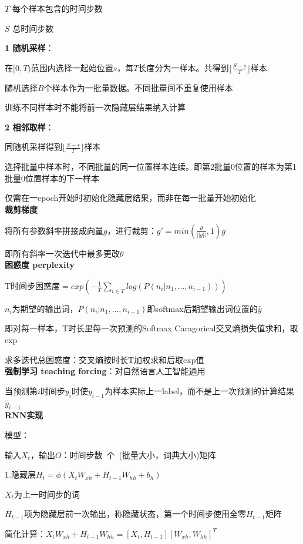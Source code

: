 \documentclass[UTF8]{ctexart}
\begin{document}
  $T$ 每个样本包含的时间步数

  $S$ 总时间步数

  \textbf{1 随机采样}：

  \quad 在$[0, T)$范围内选择一起始位置$s$，每$T$长度分为一样本。共得到$\lfloor \frac{S - s}{T} \rfloor$样本

  \quad 随机选择$B$个样本作为一批量数据。不同批量间不重复使用样本

  \quad 训练不同样本时不能将前一次隐藏层结果纳入计算
  
  \textbf{2 相邻取样}：

  \quad 同随机采样得到$\lfloor \frac{S - s}{T} \rfloor$样本

  \quad 选择批量中样本时，不同批量的同一位置样本连续。即第2批量0位置的样本为第1批量0位置样本的下一样本

  \quad 仅需在一epoch开始时初始化隐藏层结果，而非在每一批量开始初始化\\
\textbf{裁剪梯度}

  将所有参数斜率拼接成向量$g$，进行裁剪：$g' = min(\frac{\theta}{||g||}, 1)g$
  
  \quad 即所有斜率一次迭代中最多更改$\theta$\\
\textbf{困惑度 perplexity}

  T时间步困惑度$ = exp(-\frac{1}{T}\sum_{i \in T} log(P(n_i | n_1, ..., n_{i-1})))$

  \quad $n_i$为期望的输出词，$P(n_i | n_1, ..., n_{i-1})$即softmax后期望输出词位置的$\hat{y}$

  \quad 即对每一样本，T时长里每一次预测的Softmax Caragorical交叉熵损失值求和，取exp
  
  求多迭代总困惑度：交叉熵按时长T加权求和后取exp值\\
\textbf{强制学习 teaching forcing}：对自然语言人工智能通用

  当预测第$i$时间步$y_i$时使$y_{i-1}$为样本实际上一label，而不是上一次预测的计算结果$\hat{y}_{i-1}$\\
\textbf{RNN实现}

  模型：

  \quad 输入$X_t$，输出$O$：时间步数\ 个\ (批量大小，词典大小)矩阵

  \quad 1.隐藏层$H_t = \phi(X_tW_{xh} + H_{t-1}W_{hh} + b_h)$

  \quad \quad $X_t$为上一时间步的词

  \quad \quad $H_{t-1}$项为隐藏层前一次输出，称隐藏状态，第一个时间步使用全零$H_{t-1}$矩阵

  \quad \quad 简化计算：$X_tW_{xh} + H_{t-1}W_{hh} = [X_t, H_{t-1}][W_{xh}, W_{hh}]^T$
\end{document}
